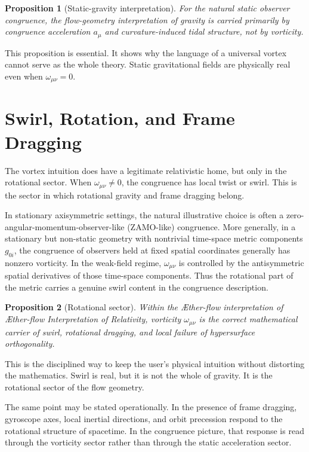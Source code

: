 \documentclass[11pt]{article}
\newcommand{\Aflow}{\AE{}ther-flow}
\newcommand{\TheoryName}{\Aflow{} Interpretation of Relativity}
\newtheorem{proposition}{Proposition}
\begin{document}
\begin{proposition}[Static-gravity interpretation]
For the natural static observer congruence, the flow-geometry interpretation of gravity is carried primarily by congruence acceleration \(a_\mu\) and curvature-induced tidal structure, not by vorticity.
\end{proposition}

This proposition is essential. It shows why the language of a universal vortex cannot serve as the whole theory. Static gravitational fields are physically real even when \(\omega_{\mu\nu}=0\).

\section{Swirl, Rotation, and Frame Dragging}

The vortex intuition does have a legitimate relativistic home, but only in the rotational sector. When \(\omega_{\mu\nu}\neq 0\), the congruence has local twist or swirl. This is the sector in which rotational gravity and frame dragging belong.

In stationary axisymmetric settings, the natural illustrative choice is often a zero-angular-momentum-observer-like (ZAMO-like) congruence. More generally, in a stationary but non-static geometry with nontrivial time-space metric components \(g_{0i}\), the congruence of observers held at fixed spatial coordinates generally has nonzero vorticity. In the weak-field regime, \(\omega_{\mu\nu}\) is controlled by the antisymmetric spatial derivatives of those time-space components. Thus the rotational part of the metric carries a genuine swirl content in the congruence description.

\begin{proposition}[Rotational sector]
Within the \Aflow{} interpretation of \TheoryName{}, vorticity \(\omega_{\mu\nu}\) is the correct mathematical carrier of swirl, rotational dragging, and local failure of hypersurface orthogonality.
\end{proposition}

This is the disciplined way to keep the user's physical intuition without distorting the mathematics. Swirl is real, but it is not the whole of gravity. It is the rotational sector of the flow geometry.

The same point may be stated operationally. In the presence of frame dragging, gyroscope axes, local inertial directions, and orbit precession respond to the rotational structure of spacetime. In the congruence picture, that response is read through the vorticity sector rather than through the static acceleration sector.
\end{document}
